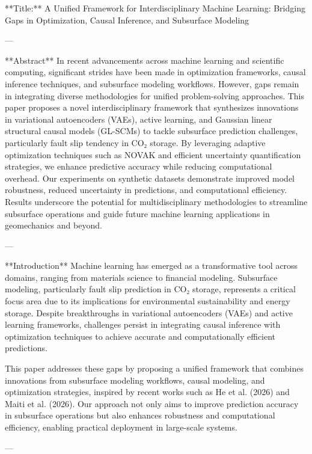 **Title:**  
A Unified Framework for Interdisciplinary Machine Learning: Bridging Gaps in Optimization, Causal Inference, and Subsurface Modeling  

---

**Abstract**  
In recent advancements across machine learning and scientific computing, significant strides have been made in optimization frameworks, causal inference techniques, and subsurface modeling workflows. However, gaps remain in integrating diverse methodologies for unified problem-solving approaches. This paper proposes a novel interdisciplinary framework that synthesizes innovations in variational autoencoders (VAEs), active learning, and Gaussian linear structural causal models (GL-SCMs) to tackle subsurface prediction challenges, particularly fault slip tendency in CO₂ storage. By leveraging adaptive optimization techniques such as NOVAK and efficient uncertainty quantification strategies, we enhance predictive accuracy while reducing computational overhead. Our experiments on synthetic datasets demonstrate improved model robustness, reduced uncertainty in predictions, and computational efficiency. Results underscore the potential for multidisciplinary methodologies to streamline subsurface operations and guide future machine learning applications in geomechanics and beyond.

---

**Introduction**  
Machine learning has emerged as a transformative tool across domains, ranging from materials science to financial modeling. Subsurface modeling, particularly fault slip prediction in CO₂ storage, represents a critical focus area due to its implications for environmental sustainability and energy storage. Despite breakthroughs in variational autoencoders (VAEs) and active learning frameworks, challenges persist in integrating causal inference with optimization techniques to achieve accurate and computationally efficient predictions. 

This paper addresses these gaps by proposing a unified framework that combines innovations from subsurface modeling workflows, causal modeling, and optimization strategies, inspired by recent works such as He et al. (2026) and Maiti et al. (2026). Our approach not only aims to improve prediction accuracy in subsurface operations but also enhances robustness and computational efficiency, enabling practical deployment in large-scale systems.

---

